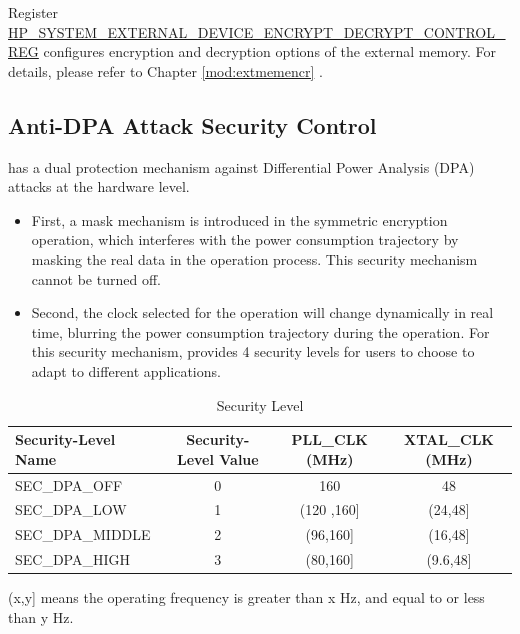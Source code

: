 \documentclass[main\_\_EN.tex]{subfiles}
\begin{document}
Register \hyperref[regdesc:HPSYSTEMEXTERNALDEVICEENCRYPTDECRYPTCONTROLREG]{HP\_SYSTEM\_EXTERNAL\_DEVICE\_ENCRYPT\_DECRYPT\_CONTROL\_REG} configures encryption and decryption options of the external memory. For details, please refer to Chapter \ref{mod:extmemencr}
\textit{}.


\subsection{Anti-DPA Attack Security Control}
\label{sec:sysreg-anti-dpa-attack-security-control}

\chipname{} has a dual protection mechanism against Differential Power Analysis (DPA) attacks at the hardware level.

\begin{itemize}
    \item First, a mask mechanism is introduced in the symmetric encryption operation, which interferes with the power consumption trajectory by masking the real data in the operation process. This security mechanism cannot be turned off.
    \item Second, the clock selected for the operation will change dynamically in real time, blurring the power consumption trajectory during the operation. For this security mechanism, \chipname{} provides 4 security levels for users to choose to adapt to different applications.
\end{itemize}

\begin{table}[H]
    \centering
    \caption{Security Level}
    \label{tab:sysreg-security-level}
    \begin{threeparttable}
    \begin{tabular}[c]{| l | c | c | c |}
    \hline
    \rowcolor{lightgray}
        \textbf{Security-Level Name} & \textbf{Security-Level Value} & \textbf{PLL\_CLK (MHz)} & \textbf{XTAL\_CLK (MHz)} \\ \hline
        SEC\_DPA\_OFF       & 0    & 160                   & 48          \\\hline
        SEC\_DPA\_LOW       & 1    & (120 ,160]\tnote{A}   & (24,48]\tnote{A}   \\\hline
        SEC\_DPA\_MIDDLE    & 2    & (96,160]\tnote{A}     & (16,48]\tnote{A} \\\hline
        SEC\_DPA\_HIGH      & 3    & (80,160]\tnote{A}     & (9.6,48]\tnote{A}   \\\hline
    \end{tabular}
    \begin{tablenotes}
        \item[A] (x,y] means the operating frequency is greater than x Hz, and equal to or less than y Hz.
    \end{tablenotes}
    \end{threeparttable}
\end{table}
\end{document}
